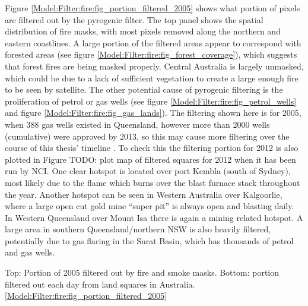     Figure \ref{Model:Filter:fire:fig_portion_filtered_2005} shows what portion of pixels are filtered out by the pyrogenic filter. 
    The top panel shows the spatial distribution of fire masks, with most pixels removed along the northern and eastern coastlines.
    A large portion of the filtered areas appear to correspond with forested areas (see figure \ref{Model:Filter:fire:fig_forest_coverage}), which suggests that forest fires are being masked properly.
    Central Australia is largely unmasked, which could be due to a lack of sufficient vegetation to create a large enough fire to be seen by satellite.
    The other potential cause of pyrogenic filtering is the proliferation of petrol or gas wells (see figure \ref{Model:Filter:fire:fig_petrol_wells} and figure \ref{Model:Filter:fire:fig_gas_lands}).
    The filtering shown here is for 2005, when 388 gas wells existed in Queensland, however more than 2000 wells (cumulative) were approved by 2013, so this may cause more filtering over the course of this thesis' timeline \parencite{Carlisle2012}.
    To check this the filtering portion for 2012 is also plotted in Figure TODO: plot map of filtered squares for 2012 when it has been run by NCI.
    One clear hotspot is located over port Kembla (south of Sydney), most likely due to the flame which burns over the blast furnace stack throughout the year.
    Another hotspot can be seen in Western Australia over Kalgoorlie, where a large open cut gold mine ``super pit'' is always open and blasting daily.
    In Western Queensland over Mount Isa there is again a mining related hotspot.
    A large area in southern Queensland/northern NSW is also heavily filtered, potentially due to gas flaring in the Surat Basin, which has thousands of petrol and gas wells.
    
    
    {Top: Portion of 2005 filtered out by fire and smoke masks. Bottom: portion filtered out each day from land squares in Australia.}{\ref{Model:Filter:fire:fig_portion_filtered_2005}}
    
    
    
